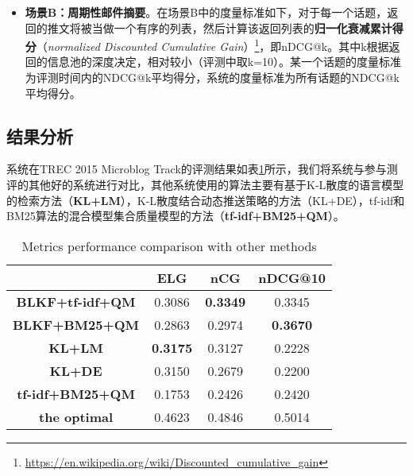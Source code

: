 \begin{itemize}
  \item \textbf{场景B：周期性邮件摘要}。在场景B中的度量标准如下，对于每一个话题，返回的推文将被当做一个有序的列表，然后计算该返回列表的\textbf{归一化衰减累计得分}（\textit{normalized Discounted Cumulative Gain}）\footnote{\url{https://en.wikipedia.org/wiki/Discounted_cumulative_gain}}，即nDCG@k。其中k根据返回的信息池的深度决定，相对较小（评测中取k=10）。某一个话题的度量标准为评测时间内的NDCG@k平均得分，系统的度量标准为所有话题的NDCG@k平均得分。
\end{itemize}

\subsection{结果分析}
\label{subsec2:res}
系统在TREC 2015 Microblog Track的评测结果如表\ref{tab:trecRes}所示，我们将系统与参与测评的其他好的系统进行对比，其他系统使用的算法主要有基于K-L散度的语言模型的检索方法（\textbf{KL+LM}），K-L散度结合动态推送策略的方法（KL+DE），tf-idf和BM25算法的混合模型集合质量模型的方法（\textbf{tf-idf+BM25+QM}）。
\begin{table}[!htbp]
  \centering
  \caption{Metrics performance comparison with other methods}
  \label{tab:trecRes}
  \begin{tabular}{cccc}
  \hline
   &ELG&nCG&nDCG@10\\
  \hline
  \textbf{BLKF+tf-idf+QM}&0.3086&\textbf{0.3349}&0.3345\\
  \hline
  \textbf{BLKF+BM25+QM}&0.2863&0.2974&\textbf{0.3670}\\
  \hline
  \textbf{KL+LM}&\textbf{0.3175}& 0.3127&0.2228\\
  \hline
  \textbf{KL+DE}&0.3150&0.2679&0.2200\\
  \hline
  \textbf{tf-idf+BM25+QM}&0.1753&0.2426&0.2420\\
  \hline
  \textbf{the optimal}&0.4623&0.4846&0.5014\\
  \hline
  \end{tabular}
\end{table}


